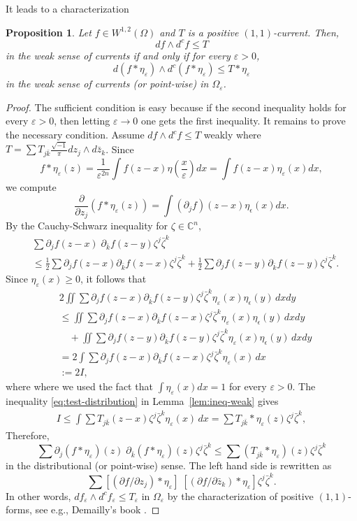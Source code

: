 \documentclass{amsart}
\renewcommand{\d}{\partial}
\newcommand{\ii}{\sqrt{-1}}
\newcommand{\eps}{\epsilon}
\newcommand{\veps}{\varepsilon}
\newcommand{\ze}{\zeta}
\newcommand{\Om}{\Omega}
\newcommand{\bC}{\mathbb{C}}
\newtheorem{prop}[thm]{Proposition}
\theoremstyle{definition}
\numberwithin{thm}{section}
\numberwithin{equation}{section}
\renewcommand{\[}{\begin{equation}}
\renewcommand{\]}{\end{equation}}
\newcommand{\wed}{\wedge}
\begin{document}
It leads to a characterization 
\begin{prop}\label{prop:ineq-weak}  Let $f \in W^{1,2}(\Om)$ and $T$ is a positive $(1,1)$-current. Then,
$$
	df \wed d^c f \leq T
$$
in the weak sense of currents if and only if for every $ \veps>0$,
$$
	d (f*\eta_\veps) \wed d^c (f *\eta_\veps) \leq T*\eta_\veps 
$$
in the weak sense of currents (or point-wise) in $\Om_\veps$.
\end{prop}
\begin{proof} The sufficient condition is easy because if the second inequality holds for every $\veps>0$, then letting $\veps\to 0$ one gets the first inequality. It remains to prove
the necessary condition. Assume $df \wed d^c f \leq T$ weakly where $T = \sum T_{j\bar k}  \frac{\ii}{\pi}  dz_j \wed d\bar z_k$. 
Since
$$
	f*\eta_\veps(z) = \frac{1}{\veps^{2n}}\int f (z -x) \eta \left(\frac{x}{\veps} \right) dx = \int f(z-x) \eta_\veps(x)dx,
$$
we compute
$$ \frac{\d }{\d z_j } (f *\eta_\veps (z))  =  \int (\d_j f) (z-x) \eta_\eps(x) dx.
$$
By the Cauchy-Schwarz inequality for $\ze \in \bC^n$, 
$$\begin{aligned}
	&\sum \d_j f (z-x) \; \d_{\bar k} f (z-y) \ze^j \bar\ze^k \\
	&\leq \frac{1}{2}\sum \d_j f (z-x) \d_{\bar k} f (z-x) \ze^j \bar\ze^k +\frac{1}{2} \sum \d_j f(z-y) \d_{\bar k} f(z-y) \ze^j \bar\ze^k.
\end{aligned}$$
Since $\eta_\veps(x) \geq 0$, it follows that 
$$\begin{aligned}
&	2\iint  \sum \d_j f (z-x)  \d_{\bar k} f (z-y) \ze^j \bar\ze^k\eta_\veps(x) \eta_\eps(y) \,dxdy \\
& 	\leq  \iint \sum \d_j f (z-x) \d_{\bar k} f (z-x) \ze^j \bar\ze^k \eta_\veps(x) \eta_\eps(y)  \,dxdy  \\
&\quad	+ \iint \sum \d_j f (z-y) \d_{\bar k} f (z-y) \ze^j \bar\ze^k \eta_\veps(x) \eta_\eps(y)\,dxdy \\
&= 2 \int \sum \d_j f (z-x) \d_{\bar k} f (z-x) \ze^j \bar\ze^k \eta_\veps(x)  \,dx \\
&:=2 I,
\end{aligned}$$
where  where we used the fact that $\int \eta_\veps (x) dx =1$ for every $\veps>0$. 
The inequality \eqref{eq:test-distribution} in Lemma~\ref{lem:ineq-weak}  gives 
$$\begin{aligned}
I \leq	\int \sum T_{j\bar k} (z-x) \ze^j \bar\ze^k \eta_\veps(x)\, dx  
=   \sum T_{j\bar k} *\eta_\veps (z) \ze^j \bar\ze^k,
\end{aligned}$$
Therefore,
$$
	\sum \d_j (f*\eta_\veps) (z) \; \d_{\bar k}(f*\eta_\veps) (z) \ze^j \bar\ze^k \leq \sum (T_{j\bar k}*\eta_\veps) (z) \ze^j \bar\ze^k
$$
in the distributional (or point-wise) sense.
The left hand side is rewritten as
$$
	\sum [(\d f/\d z_j  ) *\eta_\veps] \; [(\d f/\d \bar z_{k}) *\eta_\veps] \ze^j \bar\ze^k. 
$$
In other words, 
$
	d f_\veps \wed d^c f_\veps \leq T_\veps$ in  $\Om_\veps$
by the characterization of positive $(1,1)$-forms, see e.g., Demailly's book \cite[Chapter~3, Corollary~1.7]{D-book}. 
\end{proof}
\end{document}
